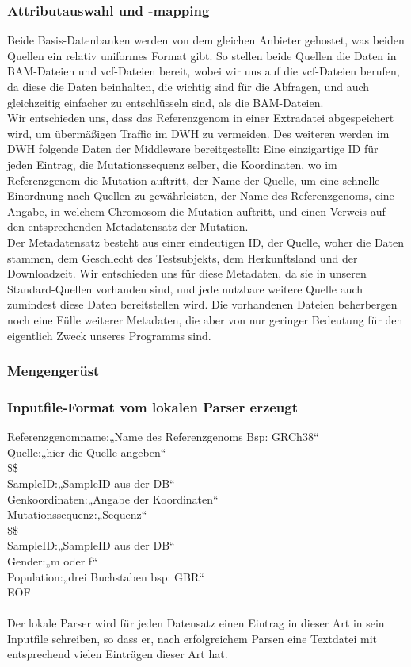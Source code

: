 \subsubsection{Attributauswahl und -mapping}
Beide Basis-Datenbanken werden von dem gleichen Anbieter gehostet, was beiden Quellen ein relativ uniformes Format gibt. So stellen beide Quellen die Daten in BAM-Dateien und vcf-Dateien bereit, wobei wir uns auf die vcf-Dateien berufen, da diese die Daten beinhalten, die wichtig sind für die Abfragen, und auch gleichzeitig einfacher zu entschlüsseln sind, als die BAM-Dateien.\\
Wir entschieden uns, dass das Referenzgenom in einer Extradatei abgespeichert wird, um übermäßigen Traffic im DWH zu vermeiden. Des weiteren werden im DWH folgende Daten der Middleware bereitgestellt: Eine einzigartige ID für jeden Eintrag, die Mutationssequenz selber, die Koordinaten, wo im Referenzgenom die Mutation auftritt, der Name der Quelle, um eine schnelle Einordnung nach Quellen zu gewährleisten, der Name des Referenzgenoms, eine Angabe, in welchem Chromosom die Mutation auftritt, und einen Verweis auf den entsprechenden Metadatensatz der Mutation.\\
Der Metadatensatz besteht aus einer eindeutigen ID, der Quelle, woher die Daten stammen, dem Geschlecht des Testsubjekts, dem Herkunftsland und der Downloadzeit. Wir entschieden uns für diese Metadaten, da sie in unseren Standard-Quellen vorhanden sind, und jede nutzbare weitere Quelle auch zumindest diese Daten bereitstellen wird. Die vorhandenen Dateien beherbergen noch eine Fülle weiterer Metadaten, die aber von nur geringer Bedeutung für den eigentlich Zweck unseres Programms sind. 
\subsubsection{Mengengerüst}




\subsubsection{Inputfile-Format vom lokalen Parser erzeugt}
Referenzgenomname:„Name des Referenzgenoms Bsp: GRCh38“\\
Quelle:„hier die Quelle angeben“\\
\$\$\\
SampleID:„SampleID aus der DB“\\
Genkoordinaten:„Angabe der Koordinaten“ \\
Mutationssequenz:„Sequenz“\\
\$\$\\
SampleID:„SampleID aus der DB“\\
Gender:„m oder f“\\
Population:„drei Buchstaben bsp: GBR“ \\
EOF\\
\\
Der lokale Parser wird für jeden Datensatz einen Eintrag in dieser Art in sein Inputfile schreiben, so dass er, nach erfolgreichem Parsen eine Textdatei mit entsprechend vielen Einträgen dieser Art hat.\\
